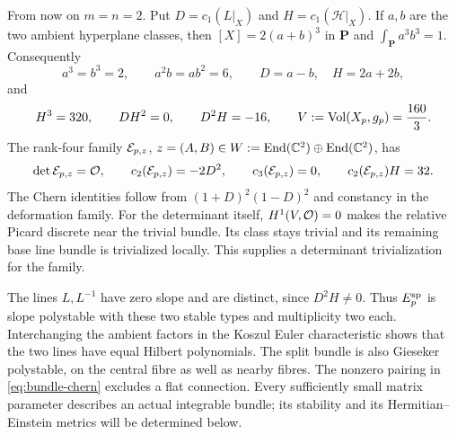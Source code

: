 From now on $m=n=2$. Put $D=c_1(L|_X)$ and
$H=c_1(\mathcal H|_X)$. If $a,b$ are the two ambient hyperplane
classes, then $[X]=2(a+b)^3$ in $\mathbf P$ and
$\int_{\mathbf P}a^3b^3=1$. Consequently
\[
 a^3=b^3=2,\qquad a^2b=ab^2=6,
 \qquad D=a-b,\quad H=2a+2b,
\]
and
\begin{equation}\label{eq:chern-numbers}
 H^3=320,\qquad DH^2=0,\qquad D^2H=-16,
 \qquad V:=\operatorname{Vol}(X_p,g_p)=\frac{160}{3}.
\end{equation}
The rank-four family $\mathcal E_{p,z}$, $z=(A,B)\in
W:=\operatorname{End}(\mathbb C^2)\oplus\operatorname{End}(\mathbb C^2)$, has
\begin{equation}\label{eq:bundle-chern}
 \det\mathcal E_{p,z}=\mathcal O,\qquad c_2(\mathcal E_{p,z})=-2D^2,
 \qquad c_3(\mathcal E_{p,z})=0,\qquad c_2(\mathcal E_{p,z})H=32.
\end{equation}
The Chern identities follow from $(1+D)^2(1-D)^2$ and
constancy in the deformation family. For the determinant
itself, $H^1(V,\mathcal O)=0$ makes the relative Picard discrete
near the trivial bundle. Its class stays trivial and its
remaining base line bundle is trivialized locally.
This supplies a determinant trivialization for the family.

The lines $L,L^{-1}$ have zero slope and are distinct,
since $D^2H\ne0$. Thus $E^{\rm sp}_p$ is slope polystable
with these two stable types and multiplicity two each.
Interchanging the ambient factors in the Koszul Euler
characteristic shows that the two lines have equal Hilbert
polynomials. The split bundle is also Gieseker polystable,
on the central fibre as well as nearby fibres. The nonzero
pairing in \eqref{eq:bundle-chern} excludes a flat connection.
Every sufficiently small matrix parameter describes an
actual integrable bundle; its stability and its
Hermitian--Einstein metrics will be determined below.
